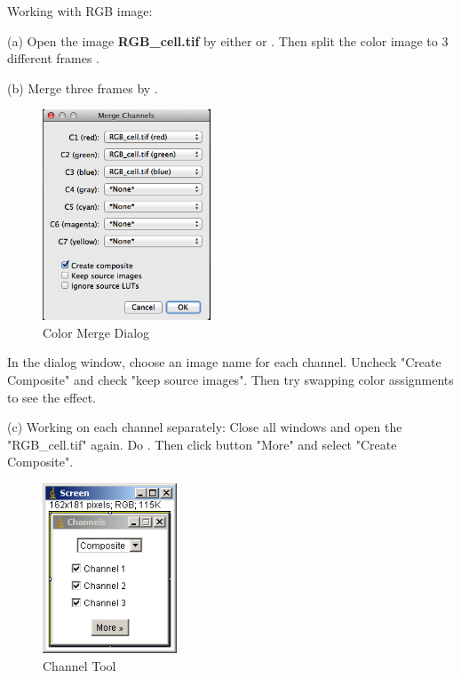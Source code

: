 \begin{indentexercise}{1}
Working with RGB image:
 
\item (a) Open the image \textbf{RGB\_cell.tif} by either  or . Then split the color image to 3 different frames . 

\item (b) Merge three frames by . 

\begin{figure}[H]
\begin{center}
\includegraphics[width=5cm]{fig/dialog_colormerge.png}
\caption{ Color Merge Dialog}
\label{fig:img14}
\end{center}
\end{figure}

In the dialog window, choose an image name for each channel. Uncheck
"Create Composite" and check
"keep source images". Then try
swapping color assignments to see the effect. 

\item (c) Working on each channel separately: Close all windows and
open the "RGB\_cell.tif" again. Do
. Then click button "More" and select "Create Composite".
\begin{figure}[H]
\begin{center}
\includegraphics[width=4cm]{fig/CMCIBasicCourse201102-img15.png}
\caption{ Channel Tool}
\label{fig:img15}
\end{center}
\end{figure}


\end{indentexercise}

